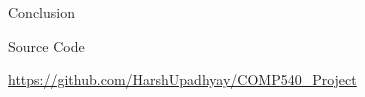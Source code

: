 \documentclass[20pt]{beamer}
\newlength{\startsepwidth}
\newlength{\sepwid}
\newlength{\twocolwid}
\newlength{\middlecolwid}
\begin{document}
\begin{frame}[t]
\begin{columns}[t]
\begin{column}{\twocolwid}
\begin{columns}[t,totalwidth=\twocolwid]
\begin{column}{\middlecolwid}
\begin{block}{Conclusion}
\end{block}

\begin{block}{Source Code}
\begin{center}
\url{https://github.com/HarshUpadhyay/COMP540_Project}
\end{center}


\end{block}

\bigskip
\bigskip





\end{column} %

\end{columns} %
\end{column}


\begin{column}{\startsepwidth}\end{column} %
\end{columns}
\end{frame} %
\end{document}
